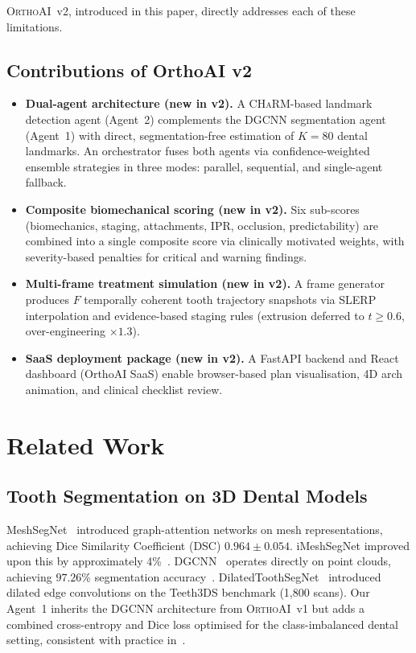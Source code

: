 \documentclass[10pt,twocolumn]{article}
\newcommand{\orthoai}{\textsc{OrthoAI}}
\newcommand{\charm}{\textsc{CHaRM}}
\newcommand{\dgcnn}{\textsc{DGCNN}}
\newcommand{\vone}{\orthoai{}~v1}
\newcommand{\vtwo}{\orthoai{}~v2}
\newcommand{\NEW}[1]{\textbf{\textcolor{blue!70!black}{#1}}}  %
\begin{document}
\vtwo{}, introduced in this paper, directly addresses each of these limitations.

\subsection{Contributions of OrthoAI v2}

\begin{itemize}[nosep,leftmargin=1.5em]
  \item \textbf{Dual-agent architecture (\NEW{new in v2}).}
    A \charm{}-based landmark detection agent (Agent~2) complements the
    \dgcnn{} segmentation agent (Agent~1) with direct, segmentation-free
    estimation of $K = 80$ dental landmarks.
    An orchestrator fuses both agents via confidence-weighted ensemble
    strategies in three modes: parallel, sequential, and single-agent
    fallback.
  \item \textbf{Composite biomechanical scoring (\NEW{new in v2}).}
    Six sub-scores (biomechanics, staging, attachments, IPR, occlusion,
    predictability) are combined into a single composite score via
    clinically motivated weights, with severity-based penalties for
    critical and warning findings.
  \item \textbf{Multi-frame treatment simulation (\NEW{new in v2}).}
    A frame generator produces $F$ temporally coherent tooth trajectory
    snapshots via SLERP interpolation and evidence-based staging rules
    (extrusion deferred to $t \geq 0.6$, over-engineering $\times 1.3$).
  \item \textbf{SaaS deployment package (\NEW{new in v2}).}
    A FastAPI backend and React dashboard (OrthoAI SaaS) enable
    browser-based plan visualisation, 4D arch animation, and
    clinical checklist review.
\end{itemize}

\section{Related Work}
\label{sec:related}

\subsection{Tooth Segmentation on 3D Dental Models}

MeshSegNet~\cite{lian2020meshsegnet} introduced graph-attention networks on
mesh representations, achieving Dice Similarity Coefficient (DSC)
$0.964 \pm 0.054$.
iMeshSegNet improved upon this by approximately 4\%~\cite{wu2022tsmdl}.
\dgcnn{}~\cite{wang2019dgcnn} operates directly on point clouds, achieving
$97.26\%$ segmentation accuracy~\cite{im2022accuracy}.
DilatedToothSegNet~\cite{yamagata2024dilated} introduced dilated edge
convolutions on the Teeth3DS benchmark (1,800 scans).
Our Agent~1 inherits the \dgcnn{} architecture from \vone{} but adds
a combined cross-entropy and Dice loss optimised for the class-imbalanced
dental setting, consistent with practice in~\cite{lian2020meshsegnet}.
\end{document}
